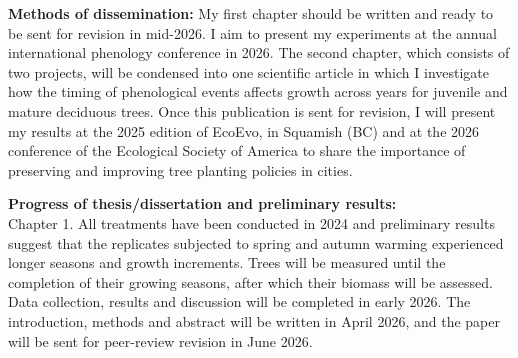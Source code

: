 \documentclass[11pt,letter]{article}
\begin{document}
\textbf{Methods of dissemination:} My first chapter should be written and ready to be sent for revision in mid-2026. I aim to present my experiments at the annual international phenology conference in 2026. The second chapter, which consists of two projects, will be condensed into one scientific article in which I investigate how the timing of phenological events affects growth across years for juvenile and mature deciduous trees. Once this publication is sent for revision, I will present my results at the 2025 edition of EcoEvo, in Squamish (BC) and at the 2026 conference of the Ecological Society of America to share the importance of preserving and improving tree planting policies in cities.
\par
\textbf{Progress of thesis/dissertation and preliminary results:}\\ 
Chapter 1. All treatments have been conducted in 2024 and preliminary results suggest that the replicates subjected to spring and autumn warming experienced longer seasons and growth increments. Trees will be measured until the completion of their growing seasons, after which their biomass will be assessed. Data collection, results and discussion will be completed in early 2026. The introduction, methods and abstract will be written in April 2026, and the paper will be sent for peer-review revision in June 2026.
\end{document}
